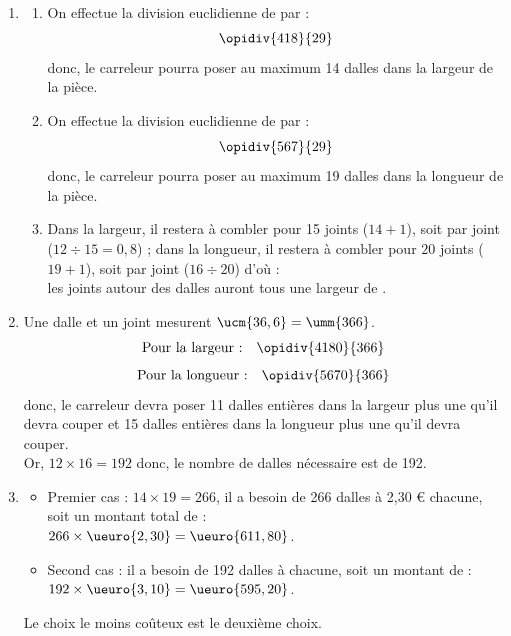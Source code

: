 {\begin{corrige}
\ \\ [-5mm]
   \begin{enumerate}
      \item 
      \begin{enumerate}
         \item On effectue la division euclidienne de  par  :
            $$\opidiv{418}{29}$$
            donc, {\blue le carreleur pourra poser au maximum 14 dalles dans la largeur de la pièce.}
         \item On effectue la division euclidienne de  par  : 
            $$\opidiv{567}{29}$$
            donc, {\blue le carreleur pourra poser au maximum 19 dalles dans la longueur de la pièce.}
         \item Dans la largeur, il restera  à combler pour 15 joints ($14+1$), soit   par joint ($12\div15 =0,8$) ; dans la longueur, il restera  à combler pour $20$ joints ($19+1$), soit  par joint ($16\div20$) d'où : \\
            {\blue les joints autour des dalles auront tous une largeur de }.
      \end{enumerate}
      \item Une dalle et un joint mesurent $\ucm{36,6} =\umm{366}$. 
         $$\text{Pour la largeur :} \quad \opidiv{4180}{366}$$
         $$\text{Pour la longueur :} \quad  \opidiv{5670}{366}$$
         donc, le carreleur devra poser 11 dalles entières dans la largeur plus une qu'il devra couper et 15 dalles entières dans la longueur plus une qu'il devra couper. \\
          Or, $12\times16 =192$ donc, {\blue le nombre de dalles nécessaire est de 192}.
      \item 
      \begin{itemize}
         \item Premier cas : $14\times19 =266$, il a besoin de 266 dalles à 2,30 \euro{} chacune, soit un montant total de : \\
            $266\times\ueuro{2,30} =\ueuro{611,80}$.
         \item Second cas : il a besoin de 192 dalles à  chacune, soit un montant de : $192\times\ueuro{3,10} =\ueuro{595,20}$.
      \end{itemize}
      {\blue Le choix le moins coûteux est le deuxième choix}.
   \end{enumerate}
\end{corrige}

}
